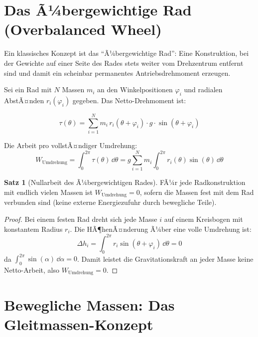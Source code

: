 ﻿\documentclass[12pt, a4paper]{report}
\theoremstyle{definition}
\newtheorem{theorem}{Satz}[section]
\theoremstyle{remark}
\begin{document}
\section{Das Ã¼bergewichtige Rad (Overbalanced Wheel)}

Ein klassisches Konzept ist das ``Ã¼bergewichtige Rad'': Eine Konstruktion, bei der
Gewichte auf einer Seite des Rades stets weiter vom Drehzentrum entfernt sind und
damit ein scheinbar permanentes Antriebsdrehmoment erzeugen.

Sei ein Rad mit $N$ Massen $m_i$ an den Winkelpositionen $\varphi_i$ und radialen
AbstÃ¤nden $r_i(\varphi_i)$ gegeben. Das Netto-Drehmoment ist:

\begin{equation}
  \tau(\theta) = \sum_{i=1}^{N} m_i \, r_i(\theta + \varphi_i) \cdot g \cdot \sin(\theta + \varphi_i)
  \label{eq:drehmoment_rad}
\end{equation}

Die Arbeit pro vollstÃ¤ndiger Umdrehung:
\begin{equation}
  W_{\text{Umdrehung}} = \int_0^{2\pi} \tau(\theta) \, \dd\theta
  = g \sum_{i=1}^N m_i \int_0^{2\pi} r_i(\theta)\sin(\theta) \, \dd\theta
  \label{eq:arbeit_umdrehung}
\end{equation}

\begin{theorem}[Nullarbeit des Ã¼bergewichtigen Rades]
  \label{thm:rad_null}
  FÃ¼r jede Radkonstruktion mit endlich vielen Massen ist
  $W_{\text{Umdrehung}} = 0$, sofern die Massen fest mit dem Rad verbunden
  sind (keine externe Energiezufuhr durch bewegliche Teile).
\end{theorem}

\begin{proof}
  Bei einem festen Rad dreht sich jede Masse $i$ auf einem Kreisbogen mit
  konstantem Radius $r_i$. Die HÃ¶henÃ¤nderung Ã¼ber eine volle Umdrehung ist:
  \begin{equation}
    \Delta h_i = \int_0^{2\pi} r_i \sin(\theta + \varphi_i) \, \dd\theta = 0
  \end{equation}
  da $\int_0^{2\pi} \sin(\alpha) \, \dd\alpha = 0$. Damit leistet die Gravitationskraft
  an jeder Masse keine Netto-Arbeit, also $W_{\text{Umdrehung}} = 0$.
\end{proof}

\section{Bewegliche Massen: Das Gleitmassen-Konzept}
\end{document}
